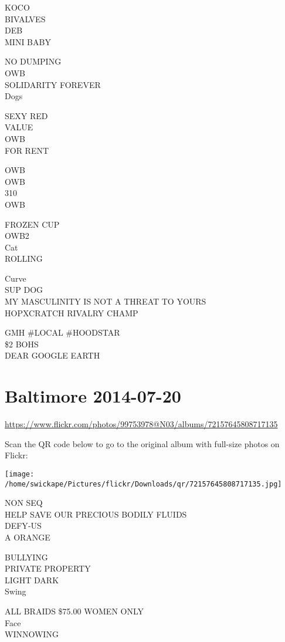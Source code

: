 \documentclass[10pt,letterpaper]{article}
\begin{document}
KOCO\\
BIVALVES\\
DEB\\
MINI BABY

NO DUMPING\\
OWB\\
SOLIDARITY FOREVER\\
Dogs

SEXY RED\\
VALUE\\
OWB\\
FOR RENT

OWB\\
OWB\\
310\\
OWB

FROZEN CUP\\
OWB2\\
Cat\\
ROLLING

Curve\\
SUP DOG\\
MY MASCULINITY IS NOT A THREAT TO YOURS\\
HOPXCRATCH RIVALRY CHAMP

GMH \#LOCAL \#HOODSTAR\\
\$2 BOHS\\
DEAR GOOGLE EARTH


\section*{Baltimore 2014-07-20}

\url{https://www.flickr.com/photos/99753978@N03/albums/72157645808717135}

Scan the QR code below to go to the original album with full-size photos on Flickr:

\texttt{[image: /home/swickape/Pictures/flickr/Downloads/qr/72157645808717135.jpg]}


NON SEQ\\
HELP SAVE OUR PRECIOUS BODILY FLUIDS\\
DEFY{-}US\\
A ORANGE

BULLYING\\
PRIVATE PROPERTY\\
LIGHT DARK\\
Swing

ALL BRAIDS \$75.00 WOMEN ONLY\\
Face\\
WINNOWING
\end{document}
